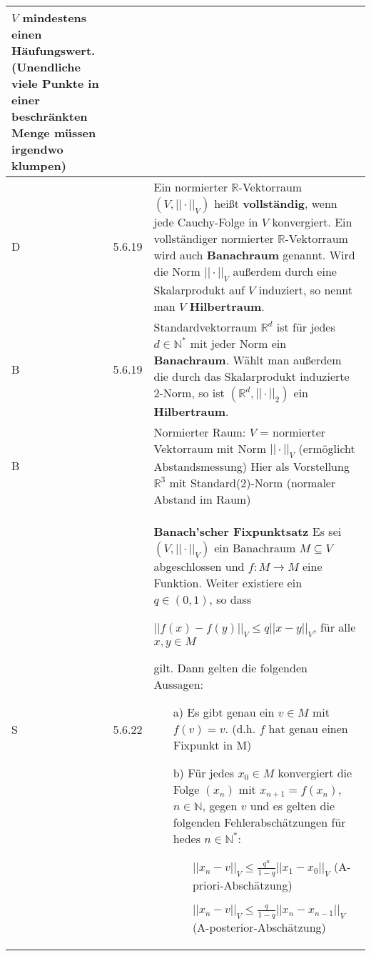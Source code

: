 \begin{longtable}{p{0.75cm} p{1cm} p{16cm}}
                    $V$ mindestens einen Häufungswert. (Unendliche viele Punkte in einer beschränkten Menge müssen irgendwo klumpen) \\
        \midrule
        D   & 5.6.19&   Ein normierter $\mathbb{R}$-Vektorraum $(V, ||\cdot||_V)$ heißt \textbf{vollständig}, wenn jede Cauchy-Folge in $V$ konvergiert.
                        Ein vollständiger normierter $\mathbb{R}$-Vektorraum wird auch \textbf{Banachraum} genannt. \hfill \break
                        Wird die Norm $||\cdot||_V$ außerdem durch eine Skalarprodukt auf $V$ induziert, so nennt man $V$ \textbf{Hilbertraum}. \\
        \midrule
        B   & 5.6.19&   Standardvektorraum $\mathbb{R}^d$ ist für jedes $d \in \mathbb{N^*}$ mit jeder Norm ein \textbf{Banachraum}. \hfill \break
                    Wählt man au\ss erdem die durch das Skalarprodukt induzierte 2-Norm, so ist $(\mathbb{R}^d, ||\cdot||_2)$ ein \textbf{Hilbertraum}. \\

        \bottomrule
        B   &       &   Normierter Raum: $V$ = normierter Vektorraum mit Norm $||\cdot||_V$ (ermöglicht Abstandsmessung) \hfill \break
                    Hier als Vorstellung $\mathbb{R}^3$ mit Standard(2)-Norm (normaler Abstand im Raum) \\
        \midrule
        S   & 5.6.22&   \textbf{Banach'scher Fixpunktsatz} \hfill \break
                    Es sei $(V, ||\cdot||_V)$ ein Banachraum $M \subseteq V$ abgeschlossen und $f: M \rightarrow M$ eine Funktion.
                    Weiter existiere ein $q \in (0,1)$, so dass \hfill \break
                    \centerline{$||f(x) - f(y)||_V \leq q ||x-y||_V$, für alle $x,y \in M$}
                    gilt. Dann gelten die folgenden Aussagen:
                    \begin{itemize}[topsep=-0.5cm]
                        \item[a)] Es gibt genau ein $v \in M$ mit $f(v) = v$. (d.h. $f$ hat genau einen Fixpunkt in M)
                        \item[b)] Für jedes $x_0 \in M$ konvergiert die Folge $(x_n)$ mit $x_{n+1} = f(x_n)$, $n \in \mathbb{N}$, gegen $v$
                                    und es gelten die folgenden Fehlerabschätzungen für hedes $n \in \mathbb{N^*}$:
                                    \begin{itemize}[topsep=-0.5cm]
                                        \item[] $||x_n-v||_V \leq \frac{q^n}{1-q}||x_1-x_0||_V$ (A-priori-Abschätzung)
                                        \item[] $||x_n-v||_V \leq \frac{q}{1-q}||x_n-x_{n-1}||_V$ (A-posterior-Abschätzung)
                                    \end{itemize}
                    \end{itemize} \vspace{-0cm} \\

        \bottomrule

    \end{longtable}


